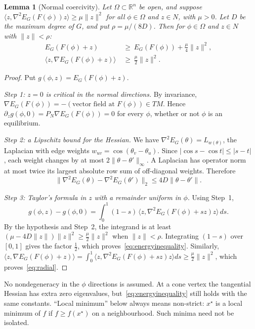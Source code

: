 \documentclass[11pt,a4paper]{article}
\newtheorem{lemma}[theorem]{Lemma}
\theoremstyle{definition}\newtheorem{conjecture}{Conjecture}
\theoremstyle{remark}\newtheorem{remark}[theorem]{Remark}
\newcommand{\R}{\mathbb R}
\begin{document}
\begin{lemma}[Normal coercivity]\label{lem:coercive}
Let $\Omega\subset\R^n$ be open, and suppose $\langle z,\nabla^2E_G(F(\phi))z\rangle\ge\mu\|z\|^2$ for all $\phi\in\Omega$ and $z\in N$, with $\mu>0$. Let $D$ be the maximum degree of $G$, and put $\rho=\mu/(8D)$. Then for $\phi\in\Omega$ and $z\in N$ with $\|z\|<\rho$:
\begin{align}
 E_G(F(\phi)+z)&\ \ge\ E_G(F(\phi))+\tfrac{\mu}{4}\|z\|^2,\label{eq:energyinequality}\\
 \langle z,\nabla E_G(F(\phi)+z)\rangle&\ \ge\ \tfrac{\mu}{2}\|z\|^2.\label{eq:radial}
\end{align}
\end{lemma}
\begin{proof}
Put $g(\phi,z)=E_G(F(\phi)+z)$.

\emph{Step 1: $z=0$ is critical in the normal directions.} By invariance, $\nabla E_G(F(\phi))=-(\text{vector field at }F(\phi))\in TM$. Hence $\partial_zg(\phi,0)=P_N\nabla E_G(F(\phi))=0$ for every $\phi$, whether or not $\phi$ is an equilibrium.

\emph{Step 2: a Lipschitz bound for the Hessian.} We have $\nabla^2E_G(\theta)=L_{w(\theta)}$, the Laplacian with edge weights $w_{uv}=\cos(\theta_v-\theta_u)$. Since $|\cos s-\cos t|\le|s-t|$, each weight changes by at most $2\|\theta-\theta'\|_\infty$. A Laplacian has operator norm at most twice its largest absolute row sum of off-diagonal weights. Therefore
\[
 \|\nabla^2E_G(\theta)-\nabla^2E_G(\theta')\|_2\le4D\|\theta-\theta'\|.
\]

\emph{Step 3: Taylor's formula in $z$ with a remainder uniform in $\phi$.} Using Step~1,
\[
 g(\phi,z)-g(\phi,0)=\int_0^1(1-s)\,\langle z,\nabla^2E_G(F(\phi)+sz)z\rangle\,ds .
\]
By the hypothesis and Step~2, the integrand is at least $(\mu-4D\|z\|)\|z\|^2\ge\tfrac\mu2\|z\|^2$ when $\|z\|<\rho$. Integrating $(1-s)$ over $[0,1]$ gives the factor $\tfrac12$, which proves~\eqref{eq:energyinequality}. Similarly, $\langle z,\nabla E_G(F(\phi)+z)\rangle=\int_0^1\langle z,\nabla^2E_G(F(\phi)+sz)z\rangle ds\ge\tfrac\mu2\|z\|^2$, which proves~\eqref{eq:radial}.
\end{proof}

No nondegeneracy in the $\phi$ directions is assumed. At a cone vertex the tangential Hessian has extra zero eigenvalues, but~\eqref{eq:energyinequality} still holds with the same constants. ``Local minimum'' below always means non-strict: $x^\star$ is a local minimum of $f$ if $f\ge f(x^\star)$ on a neighbourhood. Such minima need not be isolated.
\end{document}
